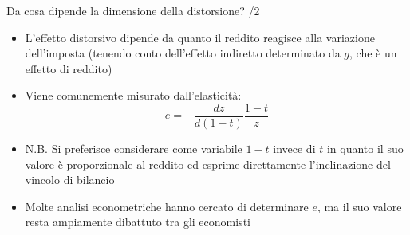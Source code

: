 \documentclass[11pt]{beamer}
\begin{document}
\begin{frame}{Da cosa dipende la dimensione della distorsione? /2}
\begin{itemize}
\item L'effetto distorsivo dipende da quanto il reddito reagisce alla variazione dell'imposta (tenendo conto dell'effetto indiretto determinato da $g$, che è un effetto di reddito)
\item Viene comunemente misurato dall'elasticità:
$$ e = -\dfrac{dz}{d(1-t)}\dfrac{1-t}{z}  $$
\item N.B. Si preferisce considerare come variabile $1-t$ invece di $t$ in quanto
il suo valore è proporzionale al reddito ed esprime direttamente
l'inclinazione del vincolo di bilancio
\item Molte analisi econometriche hanno cercato di determinare $e$, ma il suo valore resta ampiamente dibattuto tra gli economisti
\end{itemize}
\end{frame}
\end{document}
